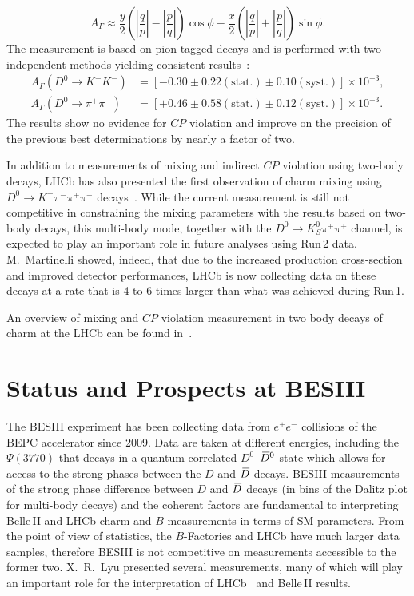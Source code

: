 \documentclass{PoS}
\newcommand{\CP}{{\ensuremath{C\!P}}\xspace}
\newcommand{\Dz}{\ensuremath{D^0}\xspace}
\def\Dbar{{\kern 0.2em\overline{\kern -0.2em\ensuremath{D}}{}}\xspace}
\newcommand{\Dzb}{\ensuremath{\Dbar{}^0}\xspace}
\newcommand{\stat}{\ensuremath{(\mathrm{stat.})}}
\newcommand{\syst}{\ensuremath{(\mathrm{syst.})}}
\newcommand{\DzDzb}{\Dz--\Dzb}
\begin{document}
\begin{equation}
A_\Gamma \approx \frac{y}{2}\left(\left|\frac{q}{p}\right|-\left|\frac{p}{q}\right|\right)\cos\phi-\frac{x}{2}\left(\left|\frac{q}{p}\right|+\left|\frac{p}{q}\right|\right)\sin\phi.
\end{equation}
The measurement is based on pion-tagged decays and is performed with two independent methods yielding consistent results~\cite{LHCb-PAPER-2016-063}:
\begin{align*}
A_\Gamma(D^0\to K^+K^-) & = \left[-0.30\pm0.22\stat\pm0.10\syst\right]\times10^{-3},\\
A_\Gamma(D^0\to \pi^+\pi^-) & = \left[+0.46\pm0.58\stat\pm0.12\syst\right]\times10^{-3}.
\end{align*}
The results show no evidence for \CP violation and improve on the precision of the previous best determinations by nearly a factor of two.

In addition to measurements of mixing and indirect \CP violation using two-body decays, LHCb has also presented the first observation of charm mixing using $D^0\to K^+\pi^-\pi^+\pi^-$ decays~\cite{LHCb-PAPER-2015-057}. While the current measurement is still not competitive in constraining the mixing parameters with the results based on two-body decays, this multi-body mode, together with the $D^0\to K_S^0\pi^+\pi^+$ channel, is expected to play an important role in future analyses using Run\,2 data. M.~Martinelli showed, indeed, that due to the increased production cross-section and improved detector performances, LHCb is now collecting data on these decays at a rate that is 4 to 6 times larger than what was achieved during Run\,1.

An overview of mixing and \CP violation measurement in two body decays of charm at the LHCb can be found in~\cite{Maguire:2017hsw}.
\section{Status and Prospects at BESIII}
\label{sec:BESIII}
%

The BESIII experiment has been collecting data from $e^+e^-$ collisions of the BEPC accelerator since 2009.
Data are taken at different energies, including the $\Psi(3770)$ that
decays in a quantum correlated \DzDzb  state which allows for access to the strong phases between the $D$ and $\Dbar$
decays. BESIII measurements of the strong phase
difference between $D$ and $\Dbar$ decays (in bins of the Dalitz plot for multi-body decays) and the coherent factors are fundamental
to interpreting Belle\,II and LHCb charm and $B$ measurements in terms of SM parameters. From the point of view of statistics, the $B$-Factories and LHCb have much larger data samples, therefore BESIII 
is not competitive on measurements accessible to the former two.
X.~R.~Lyu presented several measurements, many of which will play an important
role for the interpretation of LHCb~\cite{Malde:2223391} and Belle\,II results.
\end{document}
